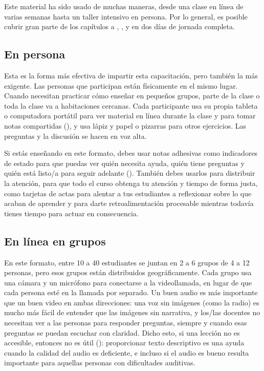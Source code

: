 Este material ha sido usado de muchas maneras,
desde una clase en línea de varias semanas hasta un taller intensivo en persona.
Por lo general, es posible cubrir gran parte de los capítulos  a ,
,
y  en dos días de jornada completa.

\subsection*{En persona}

Esta es la forma más efectiva de impartir esta capacitación,
pero también la más exigente.
Las personas que participan están físicamente en el mismo lugar.
Cuando necesitan practicar cómo enseñar en pequeños grupos,
parte de la clase o toda la clase va a habitaciones cercanas.
Cada participante usa su propia tableta o computadora portátil para ver material en línea durante la clase
y para tomar notas compartidas (),
y usa lápiz y papel o pizarras para otros ejercicios.
Las preguntas y la discusión se hacen en voz alta.

Si estás enseñando en este formato,
debes usar notas adhesivas como indicadores de estado
para que puedas ver quién necesita ayuda,
quién tiene preguntas
y quién está listo/a para seguir adelante ().
También debes usarlos para distribuir la atención,
para que todo el curso obtenga tu atención y tiempo de forma justa,
como tarjetas de actas para alentar a tus estudiantes a reflexionar sobre lo que acaban de aprender
y para darte retroalimentación procesable mientras todavía tienes tiempo para actuar en consecuencia.

\subsection*{En línea en grupos}

En este formato,
entre 10 a 40 estudiantes se juntan en 2 a 6 grupos de 4 a 12 personas,
pero esos grupos están distribuidos geográficamente.
Cada grupo usa una cámara y un micrófono para conectarse a la videollamada,
en lugar de que cada persona esté en la llamada por separado.
Un buen audio es más importante que un buen video en ambas direcciones:
una voz sin imágenes (como la radio)
es mucho más fácil de entender que las imágenes sin narrativa,
y los/las docentes no necesitan ver a las personas para responder preguntas,
siempre y cuando esas preguntas se puedan escuchar con claridad.
Dicho esto,
si una lección no es accesible, entonces no es útil ():
proporcionar texto descriptivo es una ayuda cuando la calidad del audio es deficiente,
e incluso si el audio es bueno resulta importante para aquellas personas con dificultades auditivas. 

